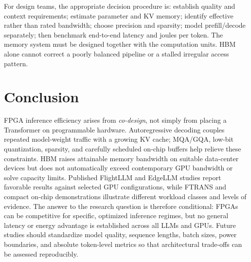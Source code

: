 \documentclass[conference,10pt]{IEEEtran}
\begin{document}
For design teams, the appropriate decision procedure is: establish quality and context requirements; estimate parameter and KV memory; identify effective rather than rated bandwidth; choose precision and sparsity; model prefill/decode separately; then benchmark end-to-end latency and joules per token. The memory system must be designed together with the computation units. HBM alone cannot correct a poorly balanced pipeline or a stalled irregular access pattern.

\section{Conclusion}
FPGA inference efficiency arises from \emph{co-design}, not simply from placing a Transformer on programmable hardware. Autoregressive decoding couples repeated model-weight traffic with a growing KV cache; MQA/GQA, low-bit quantization, sparsity, and carefully scheduled on-chip buffers help relieve these constraints. HBM raises attainable memory bandwidth on suitable data-center devices but does not automatically exceed contemporary GPU bandwidth or solve capacity limits. Published FlightLLM and EdgeLLM studies report favorable results against selected GPU configurations, while FTRANS and compact on-chip demonstrations illustrate different workload classes and levels of evidence. The answer to the research question is therefore conditional: FPGAs can be competitive for specific, optimized inference regimes, but no general latency or energy advantage is established across all LLMs and GPUs. Future studies should standardize model quality, sequence lengths, batch sizes, power boundaries, and absolute token-level metrics so that architectural trade-offs can be assessed reproducibly.

\balance


\end{document}

